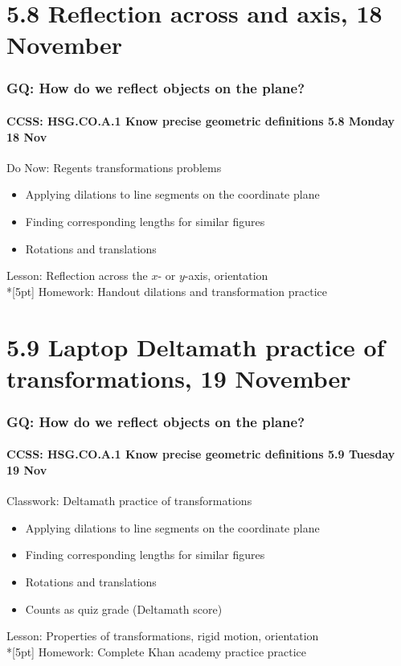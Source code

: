 \documentclass{beamer}
\begin{document}
\section{5.8 Reflection across and axis, 18 November}
\frame
{
  \frametitle{GQ: How do we reflect objects on the plane?}
  \framesubtitle{CCSS: HSG.CO.A.1 Know precise geometric definitions \hfill \alert{5.8 Monday 18 Nov}}

  \begin{block}{Do Now: Regents transformations problems}
  \begin{itemize}
    \item Applying dilations to line segments on the coordinate plane
    \item Finding corresponding lengths for similar figures
    \item Rotations and translations
  \end{itemize}
  \end{block}
  Lesson: Reflection across the $x$- or $y$-axis, orientation\\*[5pt]
  Homework: Handout dilations and transformation practice
}

\section{5.9 Laptop Deltamath practice of transformations, 19 November}
\frame
{
  \frametitle{GQ: How do we reflect objects on the plane?}
  \framesubtitle{CCSS: HSG.CO.A.1 Know precise geometric definitions \hfill \alert{5.9 Tuesday 19 Nov}}

  \begin{block}{Classwork: Deltamath practice of transformations}
  \begin{itemize}
    \item Applying dilations to line segments on the coordinate plane
    \item Finding corresponding lengths for similar figures
    \item Rotations and translations
    \item Counts as quiz grade (Deltamath score)
  \end{itemize}
  \end{block}
  Lesson: Properties of transformations, rigid motion, orientation\\*[5pt]
  Homework: Complete Khan academy practice practice
}
\end{document}
